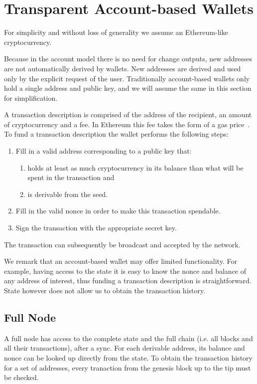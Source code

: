 \section{Transparent Account-based Wallets}
\label{transparent-account}

For simplicity and without loss of generality we assume an Ethereum-like cryptocurrency.

Because in the account model there is no need for change outputs, new addresses are not automatically derived by wallets. New addresses are derived and used only by the explicit request of the user. Traditionally account-based wallets only hold a single address and public key, and we will assume the same in this section for simplification.

A transaction description is comprised of the address of the recipient, an amount of cryptocurrency and a fee. In Ethereum this fee takes the form of a gas price~\cite{wood2014ethereum}.
To fund a transaction description the wallet performs the following steps:

\begin{enumerate}
    \item Fill in a valid address corresponding to a public key that:
    \begin{enumerate}
        \item holds at least as much cryptocurrency in its balance than what will be spent in the transaction and
        \item is derivable from the seed.
    \end{enumerate}
    \item Fill in the valid nonce in order to make this transaction spendable.
    \item Sign the transaction with the appropriate secret key.
\end{enumerate}

The transaction can subsequently be broadcast and accepted by the network.

We remark that an account-based wallet may offer limited functionality. For example, having access to the state it is easy to know the nonce and balance of any address of interest, thus funding a transaction description is straightforward. State however does not allow us to obtain the transaction history.

\subsection{Full Node}
A full node has access to the complete state and the full chain (i.e. all blocks and all their transactions), after a sync. For each derivable address, its balance and nonce can be looked up directly from the state. To obtain the transaction history for a set of addresses, every tranaction from the genesis block up to the tip must be checked.

